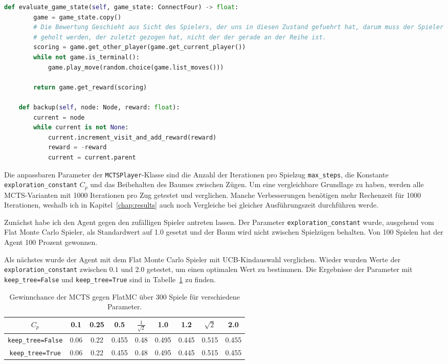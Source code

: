\begin{lstlisting}[language=Python,caption=Die MCTSPlayer Klasse,label={lst:mcts-player}]
    def evaluate_game_state(self, game_state: ConnectFour) -> float:
        game = game_state.copy()
        # Die Bewertung Geschieht aus Sicht des Spielers, der uns in diesen Zustand gefuehrt hat, darum muss der Spieler
        # geholt werden, der zuletzt gezogen hat, nicht der der gerade an der Reihe ist.
        scoring = game.get_other_player(game.get_current_player())
        while not game.is_terminal():
            game.play_move(random.choice(game.list_moves()))

        return game.get_reward(scoring)

    def backup(self, node: Node, reward: float):
        current = node
        while current is not None:
            current.increment_visit_and_add_reward(reward)
            reward = -reward
            current = current.parent

\end{lstlisting}

Die anpassbaren Parameter der \verb|MCTSPlayer|-Klasse sind die Anzahl der Iterationen pro Spielzug \verb|max_steps|, die Konstante \verb|exploration_constant| $C_p$ und das Beibehalten des Baumes zwischen Zügen.
Um eine vergleichbare Grundlage zu haben, werden alle MCTS-Varianten mit 1000 Iterationen pro Zug getestet und verglichen.
Manche Verbesserungen benötigen mehr Rechenzeit für 1000 Iterationen, weshalb ich in Kapitel~\ref{chap:results} auch noch Vergleiche bei gleicher Ausführungszeit durchführen werde.

Zunächst habe ich den Agent gegen den zufälligen Spieler antreten lassen.
Der Parameter \verb|exploration_constant| wurde, ausgehend vom Flat Monte Carlo Spieler, als Standardwert auf 1.0 gesetzt und der Baum wird nicht zwischen Spielzügen behalten.
Von 100 Spielen hat der Agent 100 Prozent gewonnen.

Als nächstes wurde der Agent mit dem Flat Monte Carlo Spieler mit UCB-Kindauswahl verglichen.
Wieder wurden Werte der \verb|exploration_constant| zwischen $0.1$ und $2.0$ getestet, um einen optimalen Wert zu bestimmen.
Die Ergebnisse der Parameter mit \verb|keep_tree=False| und \verb|keep_tree=True| sind in Tabelle~\ref{tab:mcts-flat-mc} zu finden.

\begin{table}[h!]
\centering
\begin{tabular}{ |c||c|c|c|c|c|c|c|c| }
 \hline
 $C_p$ & 0.1 & 0.25 & 0.5 & $\frac{1}{\sqrt{2}}$ & 1.0 & 1.2 & $\sqrt{2}$ & 2.0 \\
 \hline
 \verb|keep_tree=False| & 0.06 & 0.22 & 0.455 & 0.48 & 0.495 & 0.445 & 0.515 & 0.455 \\
 \hline
 \verb|keep_tree=True| & 0.06 & 0.22 & 0.455 & 0.48 & 0.495 & 0.445 & 0.515 & 0.455 \\
 \hline
\end{tabular}
\caption{Gewinnchance der MCTS gegen FlatMC über 300 Spiele für verschiedene Parameter.}
\label{tab:mcts-flat-mc}
\end{table}


